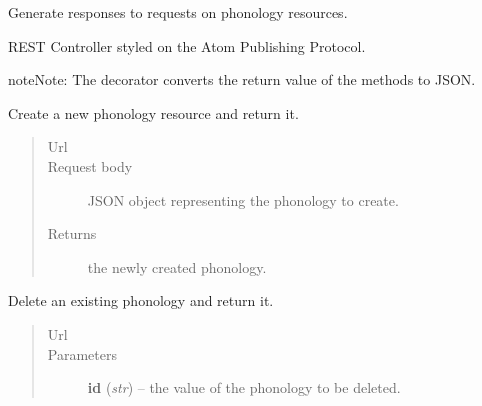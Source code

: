 \documentclass[letterpaper,10pt,english]{sphinxmanual}
\begin{document}
\begin{fulllineitems}
\label{api:onlinelinguisticdatabase.controllers.phonologies.PhonologiesController}
Generate responses to requests on phonology resources.

REST Controller styled on the Atom Publishing Protocol.

\begin{notice}{note}{Note:}
The  decorator converts the return value of the methods to
JSON.
\end{notice}

\begin{fulllineitems}
\label{api:onlinelinguisticdatabase.controllers.phonologies.PhonologiesController.create}
Create a new phonology resource and return it.
\begin{quote}\begin{description}
\item[{Url }] \leavevmode
{}

\item[{Request body}] \leavevmode
JSON object representing the phonology to create.

\item[{Returns}] \leavevmode
the newly created phonology.

\end{description}\end{quote}

\end{fulllineitems}


\begin{fulllineitems}
\label{api:onlinelinguisticdatabase.controllers.phonologies.PhonologiesController.delete}
Delete an existing phonology and return it.
\begin{quote}\begin{description}
\item[{Url }] \leavevmode
{}

\item[{Parameters}] \leavevmode
\textbf{id} (\emph{str}) -- the  value of the phonology to be deleted.


\end{description}
\end{quote}
\end{fulllineitems}
\end{fulllineitems}
\end{document}
